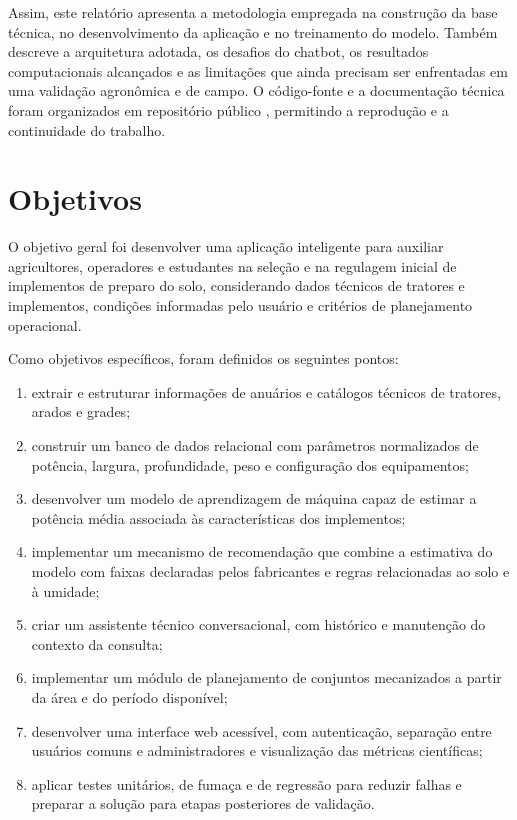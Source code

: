 \documentclass[12pt,a4paper]{article}
\begin{document}
Assim, este relatório apresenta a metodologia empregada na construção da base técnica, no desenvolvimento da aplicação e no treinamento do modelo. Também descreve a arquitetura adotada, os desafios do chatbot, os resultados computacionais alcançados e as limitações que ainda precisam ser enfrentadas em uma validação agronômica e de campo. O código-fonte e a documentação técnica foram organizados em repositório público \cite{repositorioarips}, permitindo a reprodução e a continuidade do trabalho.

\section{Objetivos}

O objetivo geral foi desenvolver uma aplicação inteligente para auxiliar agricultores, operadores e estudantes na seleção e na regulagem inicial de implementos de preparo do solo, considerando dados técnicos de tratores e implementos, condições informadas pelo usuário e critérios de planejamento operacional.

Como objetivos específicos, foram definidos os seguintes pontos:

\begin{enumerate}
  \item extrair e estruturar informações de anuários e catálogos técnicos de tratores, arados e grades;
  \item construir um banco de dados relacional com parâmetros normalizados de potência, largura, profundidade, peso e configuração dos equipamentos;
  \item desenvolver um modelo de aprendizagem de máquina capaz de estimar a potência média associada às características dos implementos;
  \item implementar um mecanismo de recomendação que combine a estimativa do modelo com faixas declaradas pelos fabricantes e regras relacionadas ao solo e à umidade;
  \item criar um assistente técnico conversacional, com histórico e manutenção do contexto da consulta;
  \item implementar um módulo de planejamento de conjuntos mecanizados a partir da área e do período disponível;
  \item desenvolver uma interface web acessível, com autenticação, separação entre usuários comuns e administradores e visualização das métricas científicas;
  \item aplicar testes unitários, de fumaça e de regressão para reduzir falhas e preparar a solução para etapas posteriores de validação.
\end{enumerate}
\end{document}
